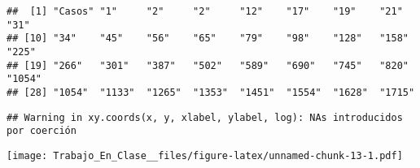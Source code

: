 \documentclass[]{elsarticle} %
\newenvironment{Shaded}{\begin{snugshade}}{\end{snugshade}}
\newcommand{\AttributeTok}[1]{\textcolor[rgb]{0.77,0.63,0.00}{#1}}
\newcommand{\DecValTok}[1]{\textcolor[rgb]{0.00,0.00,0.81}{#1}}
\newcommand{\FunctionTok}[1]{\textcolor[rgb]{0.00,0.00,0.00}{#1}}
\newcommand{\NormalTok}[1]{#1}
\newcommand{\SpecialCharTok}[1]{\textcolor[rgb]{0.00,0.00,0.00}{#1}}
\newcommand{\StringTok}[1]{\textcolor[rgb]{0.31,0.60,0.02}{#1}}
\begin{document}
\begin{Shaded}
\end{Shaded}

\begin{verbatim}
##  [1] "Casos" "1"     "2"     "2"     "12"    "17"    "19"    "21"    "31"   
## [10] "34"    "45"    "56"    "65"    "79"    "98"    "128"   "158"   "225"  
## [19] "266"   "301"   "387"   "502"   "589"   "690"   "745"   "820"   "1054" 
## [28] "1054"  "1133"  "1265"  "1353"  "1451"  "1554"  "1628"  "1715"
\end{verbatim}

\begin{Shaded}
\end{Shaded}

\begin{verbatim}
## Warning in xy.coords(x, y, xlabel, ylabel, log): NAs introducidos por coerción
\end{verbatim}

\texttt{[image: Trabajo\_En\_Clase\_\_files/figure-latex/unnamed-chunk-13-1.pdf]}
\end{document}
